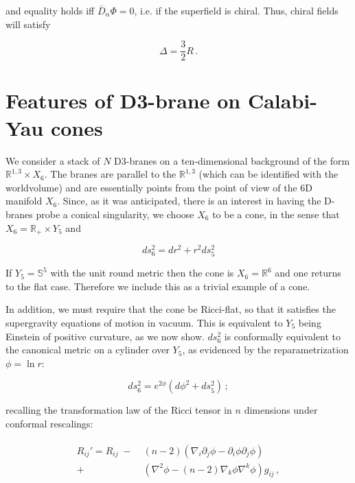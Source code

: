 and equality holds iff $\overline D_{\dot\alpha} \Phi = 0$, i.e. if the superfield is chiral. Thus, chiral fields will satisfy

\begin{equation}
\Delta = \frac{3}{2} R\,. \label{deltarcharge}
\end{equation}


\section{Features of D3-brane on Calabi-Yau cones}\label{sec:generalcones}

We consider a stack of $N$ D3-branes on a ten-dimensional background of the form $\mathbb{R}^{1,3} \times X_6$. The branes are parallel to the $\mathbb{R}^{1,3}$ (which can be identified with the worldvolume) and are essentially points from the point of view of the 6D manifold $X_6$. Since, as it was anticipated, there is an interest in having the D-branes probe a conical singularity, we choose $X_6$ to be a cone, in the sense that $X_6 = \mathbb{R}_+ \times Y_5$ and

\begin{equation}
	ds_6^2 = dr^2 + r^2 ds_5^2
	\label{}
\end{equation}

If $Y_5 = \mathbb{S}^5$ with the unit round metric then the cone is $X_6 = \mathbb{R}^6$ and one returns to the flat case. Therefore we include this as a trivial example of a cone.

In addition, we must require that the cone be Ricci-flat, so that it satisfies the supergravity equations of motion in vacuum. This is equivalent to $Y_5$ being Einstein of positive curvature, as we now show. $ds_6^2$ is conformally equivalent to the canonical metric on a cylinder over $Y_5$, as evidenced by the reparametrization $\phi = \ln r$:

\begin{equation}
	ds_6^2 = e^{2\phi} \left( d\phi^2 + ds_5^2 \right)\,;
\end{equation}

recalling the transformation law of the Ricci tensor in $n$ dimensions under conformal rescalings:

\begin{align}
	\begin{split}
	R_{ij}' = R_{ij} \; - &\; (n-2)\left( \nabla_i \partial_j \phi - \partial_i \phi \partial_j \phi \right) \\+ &\; \left( \nabla^2 \phi - (n-2) \nabla_k \phi \nabla^k \phi \right) g_{ij}\,,
\end{split}
\end{align}

